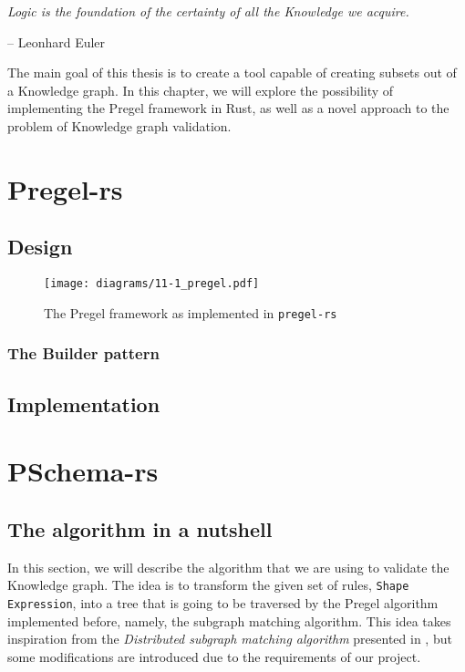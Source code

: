 \epigraph{\textit{Logic is the foundation of the certainty of all the Knowledge we acquire.}}{-- \textup{Leonhard Euler}}

The main goal of this thesis is to create a tool capable of creating subsets out of a Knowledge graph. In this chapter, we will explore the possibility of implementing the Pregel framework in Rust, as well as a novel approach to the problem of Knowledge graph validation.

\section{Pregel-rs}

\subsection{Design}

\begin{figure}[ht]
    \centering
    \texttt{[image: diagrams/11-1\_pregel.pdf]}
    \caption{The Pregel framework as implemented in \texttt{pregel-rs}}
\end{figure}

\subsubsection{The Builder pattern}

\subsection{Implementation}

\section{PSchema-rs}

\subsection{The algorithm in a nutshell}

In this section, we will describe the algorithm that we are using to validate the Knowledge graph. The idea is to transform the given set of rules, \texttt{Shape} \texttt{Expression}, into a tree that is going to be traversed by the Pregel algorithm implemented before, namely, the subgraph matching algorithm. This idea takes inspiration from the \textit{Distributed subgraph matching algorithm} presented in \cite{Xu2019}, but some modifications are introduced due to the requirements of our project.

